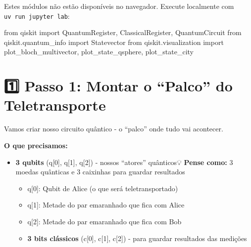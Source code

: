 \documentclass[
  brazilian,
]{report}
\newenvironment{Shaded}{\begin{snugshade}}{\end{snugshade}}
\newcommand{\ImportTok}[1]{\textcolor[rgb]{0.00,0.46,0.62}{#1}}
\newcommand{\NormalTok}[1]{\textcolor[rgb]{0.00,0.23,0.31}{#1}}
\begin{document}
\begin{tcolorbox}[enhanced jigsaw, arc=.35mm, bottomrule=.15mm, bottomtitle=1mm, breakable, colback=white, colbacktitle=quarto-callout-note-color!10!white, colframe=quarto-callout-note-color-frame, coltitle=black, left=2mm, leftrule=.75mm, opacityback=0, opacitybacktitle=0.6, rightrule=.15mm, title=\textcolor{quarto-callout-note-color}{\faInfo}\hspace{0.5em}{🔒 Imports do Qiskit (requerem execução local)}, titlerule=0mm, toprule=.15mm, toptitle=1mm]

Estes módulos não estão disponíveis no navegador. Execute localmente com
\texttt{uv\ run\ jupyter\ lab}:

\begin{Shaded}
\begin{Highlighting}[]
\ImportTok{from}\NormalTok{ qiskit }\ImportTok{import}\NormalTok{ QuantumRegister, ClassicalRegister, QuantumCircuit}
\ImportTok{from}\NormalTok{ qiskit.quantum\_info }\ImportTok{import}\NormalTok{ Statevector}
\ImportTok{from}\NormalTok{ qiskit.visualization }\ImportTok{import}\NormalTok{ plot\_bloch\_multivector, plot\_state\_qsphere, plot\_state\_city}
\end{Highlighting}
\end{Shaded}

\end{tcolorbox}

\section{1️⃣ Passo 1: Montar o ``Palco'' do
Teletransporte}\label{passo-1-montar-o-palco-do-teletransporte}

Vamos criar nosso circuito quântico - o ``palco'' onde tudo vai
acontecer.

\textbf{O que precisamos:}

\begin{itemize}
\item
  \textbf{3 qubits} (q{[}0{]}, q{[}1{]}, q{[}2{]}) - nossos ``atores''
  quânticos💡 \textbf{Pense como:} 3 moedas quânticas e 3 caixinhas para
  guardar resultados

  \begin{itemize}
  \item
    q{[}0{]}: Qubit de Alice (o que será teletransportado)
  \item
    q{[}1{]}: Metade do par emaranhado que fica com Alice
  \item
    q{[}2{]}: Metade do par emaranhado que fica com Bob
  \item
    \textbf{3 bits clássicos} (c{[}0{]}, c{[}1{]}, c{[}2{]}) - para
    guardar resultados das medições
  \end{itemize}
\end{itemize}
\end{document}

